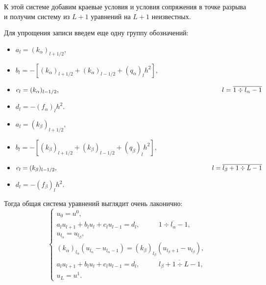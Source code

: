 		К этой системе добавим краевые условия и условия сопряжения в точке разрыва и получим систему из $L + 1$ уравнений на $L + 1$ неизвестных.
		
		Для упрощения записи введем еще одну группу обозначений:
		\begin{itemize}
			\item $a_l = (k_\alpha)_{l + 1/2},$
			
			\item $b_l = -\left[(k_\alpha)_{l + 1/2} + (k_\alpha)_{l - 1/2} + (q_\alpha)_l h^2\right],$
			
			\item $c_l = (k_\alpha)_{l - 1/2}, \hspace{85mm} l = \overline{1 \div l_\alpha - 1}$
			
			\item $d_l = -(f_\alpha)_l h^2.$
		\end{itemize}
	
		\vspace{20mm}
	
		\begin{itemize}
			\item $a_l = (k_\beta)_{l + 1/2},$
			
			\item $b_l = -\left[(k_\beta)_{l + 1/2} + (k_\beta)_{l - 1/2} + (q_\beta)_l h^2\right],$
			
			\item $c_l = (k_\beta)_{l - 1/2}, \hspace{85mm} l = \overline{l_\beta + 1 \div L - 1}$
			
			\item $d_l = -(f_\beta)_l h^2.$
		\end{itemize}
		
		
		
		
		Тогда общая система уравнений выглядит очень лаконично:
		\begin{equation}
			\begin{cases}
				u_0 = u^0, \\
				a_l u_{l+1} + b_l u_l + c_l u_{l - 1} = d_l, \;\;\;\;\;\;\;\;\;\; \overline{1 \div l_\alpha - 1}, \\
				u_{l_\alpha} = u_{l_\beta}, \\
				(k_\alpha)_{l_\alpha}(u_{l_\alpha} - u_{l_\alpha - 1}) = (k_\beta)_{l_\beta}(u_{l_\beta + 1} - u_{l_\beta}), \\
				a_l u_{l+1} + b_l u_l + c_l u_{l - 1} = d_l, \;\;\;\;\;\;\;\;\;\; \overline{l_\beta + 1 \div L - 1}, \\
				u_L = u^1.
			\end{cases}
			\label{MAIN_SYS}
		\end{equation}
	
